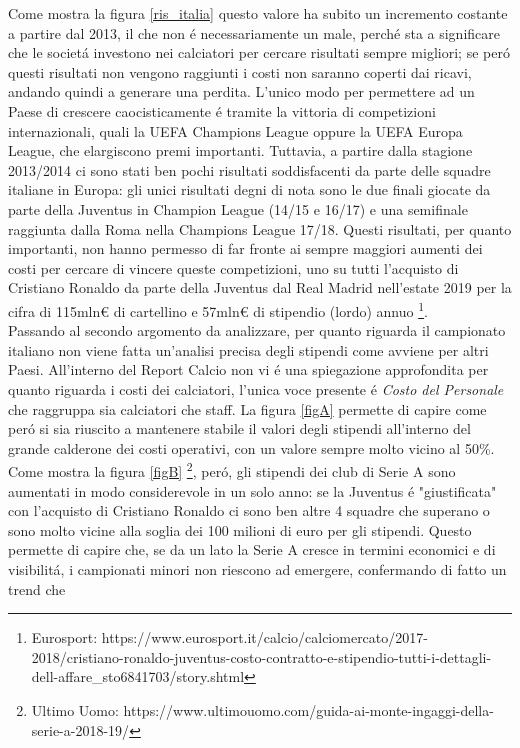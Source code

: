 \documentclass[
    corpo=12pt,
    oneside,
    evenboxes,
    tipotesi=triennale,
    stile=classica,
    oldstyle,
    autoretitolo,
    greek,
]{toptesi}
\begin{document}
\begin{interlinea}{1.5}
Come mostra la figura \ref{ris_italia} questo valore ha subito un incremento costante a partire dal 2013, il che non \'e necessariamente un male, perch\'e 
sta a significare che le societ\'a investono nei calciatori per cercare risultati sempre migliori; se per\'o questi risultati non vengono
raggiunti i costi non saranno coperti dai ricavi, andando quindi a generare una perdita. L'unico modo per permettere ad un Paese di crescere
caocisticamente \'e tramite la vittoria di competizioni internazionali, quali la UEFA Champions League oppure la UEFA Europa League, che
elargiscono premi importanti. Tuttavia, a partire dalla stagione 2013/2014 ci sono stati ben pochi risultati soddisfacenti 
da parte delle squadre italiane in Europa: gli unici risultati degni di nota sono le due finali giocate da parte della Juventus in 
Champion League (14/15 e 16/17) e una semifinale raggiunta dalla Roma nella Champions League 17/18. Questi risultati, per quanto importanti,
non hanno permesso di far fronte ai sempre maggiori aumenti dei costi per cercare di vincere queste competizioni, uno su tutti l'acquisto
di Cristiano Ronaldo da parte della Juventus dal Real Madrid nell'estate 2019 per la cifra di 115mln€ di cartellino e 57mln€ di stipendio (lordo) annuo
\footnote{Eurosport: https://www.eurosport.it/calcio/calciomercato/2017-2018/cristiano-ronaldo-juventus-costo-contratto-e-stipendio-tutti-i-dettagli-dell-affare\_sto6841703/story.shtml}.\\
Passando al secondo argomento da analizzare, per quanto riguarda il campionato italiano non viene fatta un'analisi precisa 
degli stipendi come avviene per altri Paesi. All'interno del Report Calcio non vi \'e una spiegazione approfondita per quanto riguarda i costi
dei calciatori, l'unica voce presente \'e \emph{Costo del Personale} che raggruppa sia calciatori che staff. La figura \ref{figA}
permette di capire come per\'o si sia riuscito a mantenere stabile il valori degli stipendi all'interno del grande calderone dei costi 
operativi, con un valore sempre molto vicino al 50\%. Come mostra la figura \ref{figB} \footnote{Ultimo Uomo: https://www.ultimouomo.com/guida-ai-monte-ingaggi-della-serie-a-2018-19/}, per\'o, gli stipendi dei club di Serie A sono aumentati
in modo considerevole in un solo anno: se la Juventus \'e "giustificata" con l'acquisto di Cristiano Ronaldo ci sono ben altre 4 squadre
che superano o sono molto vicine alla soglia dei 100 milioni di euro per gli stipendi. Questo permette di capire che, se da un lato 
la Serie A cresce in termini economici e di visibilit\'a, i campionati minori non riescono ad emergere, confermando di fatto un trend che 

\end{interlinea}
\end{document}
